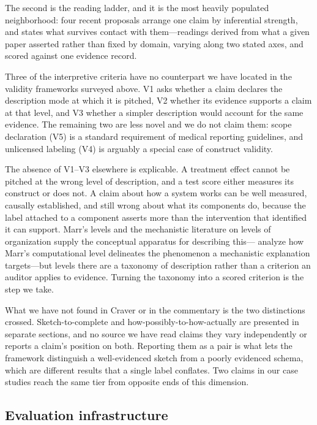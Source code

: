 \documentclass{article}
\begin{document}
The second is the reading ladder, and it is the most heavily populated
neighborhood: four recent proposals arrange one claim by inferential strength,
and  states what survives contact with them---readings
derived from what a given paper asserted rather than fixed by domain, varying
along two stated axes, and scored against one evidence record.

Three of the interpretive criteria have no counterpart we have located in the validity frameworks surveyed above. V1 asks whether a claim declares the description mode at which it is pitched, V2 whether its evidence supports a claim at that level, and V3 whether a simpler description would account for the same evidence. The remaining two are less novel and we do not claim them: scope declaration (V5) is a standard requirement of medical reporting guidelines, and unlicensed labeling (V4) is arguably a special case of construct validity.

The absence of V1--V3 elsewhere is explicable. A treatment effect cannot be pitched at the wrong level of description, and a test score either measures its construct or does not. A claim about how a system works can be well measured, causally established, and still wrong about what its components do, because the label attached to a component asserts more than the intervention that identified it can support. Marr's levels and the mechanistic literature on levels of organization supply the conceptual apparatus for describing this---\citet{shagrir2017marr} analyze how Marr's computational level delineates the phenomenon a mechanistic explanation targets---but levels there are a taxonomy of description rather than a criterion an auditor applies to evidence. Turning the taxonomy into a scored criterion is the step we take.

What we have not found in Craver or in the commentary is the two distinctions crossed. Sketch-to-complete and how-possibly-to-how-actually are presented in separate sections, and no source we have read claims they vary independently or reports a claim's position on both. Reporting them as a pair is what lets the framework distinguish a well-evidenced sketch from a poorly evidenced schema, which are different results that a single label conflates. Two claims in our case studies reach the same tier from opposite ends of this dimension.

\subsection{Evaluation infrastructure}
\label{sec:related-mi}
\end{document}
